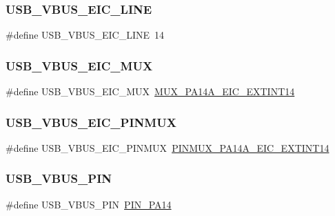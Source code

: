 \subsubsection{\texorpdfstring{USB\_VBUS\_EIC\_LINE}{USB\_VBUS\_EIC\_LINE}}
{\footnotesize\ttfamily \#define U\+S\+B\+\_\+\+V\+B\+U\+S\+\_\+\+E\+I\+C\+\_\+\+L\+I\+NE~14}

\mbox{\label{group__samd21__xplained__pro__features__group_gacf465ba3dac5d96582bdb94d7b826d12}} 
\subsubsection{\texorpdfstring{USB\_VBUS\_EIC\_MUX}{USB\_VBUS\_EIC\_MUX}}
{\footnotesize\ttfamily \#define U\+S\+B\+\_\+\+V\+B\+U\+S\+\_\+\+E\+I\+C\+\_\+\+M\+UX~\mbox{\hyperlink{pio_2samd21j18a_8h_afeb03044b3ae72cc083bf75edd71caf2}{M\+U\+X\+\_\+\+P\+A14\+A\+\_\+\+E\+I\+C\+\_\+\+E\+X\+T\+I\+N\+T14}}}

\mbox{\label{group__samd21__xplained__pro__features__group_ga2582d6c6524bdd643b5982b664fc15b1}} 
\subsubsection{\texorpdfstring{USB\_VBUS\_EIC\_PINMUX}{USB\_VBUS\_EIC\_PINMUX}}
{\footnotesize\ttfamily \#define U\+S\+B\+\_\+\+V\+B\+U\+S\+\_\+\+E\+I\+C\+\_\+\+P\+I\+N\+M\+UX~\mbox{\hyperlink{pio_2samd21j18a_8h_acd04dc85dd82af514fd78127a6d13449}{P\+I\+N\+M\+U\+X\+\_\+\+P\+A14\+A\+\_\+\+E\+I\+C\+\_\+\+E\+X\+T\+I\+N\+T14}}}

\mbox{\label{group__samd21__xplained__pro__features__group_ga5e087011ca814d14f4a42be3b9621e1c}} 
\subsubsection{\texorpdfstring{USB\_VBUS\_PIN}{USB\_VBUS\_PIN}}
{\footnotesize\ttfamily \#define U\+S\+B\+\_\+\+V\+B\+U\+S\+\_\+\+P\+IN~\mbox{\hyperlink{pio_2samd21j18a_8h_ad71083de279943a97f0a159c824c290b}{P\+I\+N\+\_\+\+P\+A14}}}

